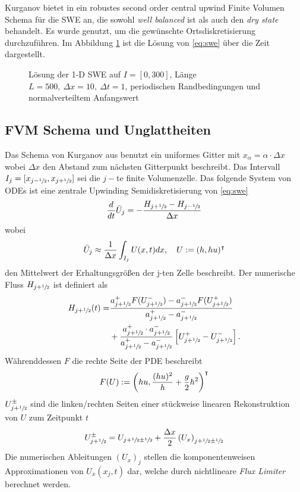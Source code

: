 Kurganov bietet in \cite{kurganov2007second} ein robustes second order central upwind Finite Volumen Schema für die SWE an, die sowohl \textit{well balanced} ist als auch den \textit{dry state} behandelt. Es wurde genutzt, um die gewünschte Ortsdiskretisierung durchzuführen. Im Abbildung \ref{fig:sweSolution} ist die Lösung von \eqref{eq:swe} über die Zeit dargestellt.

\begin{figure}
 \centering
 
 \caption{Lösung der 1-D SWE auf $I=[0,300]$, Länge $L=500,~\Delta x=10,~\Delta t=1$, periodischen Randbedingungen und normalverteiltem Anfangswert}
 \label{fig:sweSolution}
\end{figure}

\subsection{FVM Schema und Unglattheiten}
\label{sec:fvmFluxEigen}
Das Schema von Kurganov aus \cite{kurganov2007second} benutzt ein uniformes Gitter mit $x_\alpha=\alpha\cdot \Delta x$ wobei $\Delta x$ den Abstand zum nächsten Gitterpunkt beschreibt. Das Intervall $I_j = [x_{j-\sfrac{1}{2}},x_{j+\sfrac{1}{2}}]$ sei die $j-$te finite Volumenzelle.
Das folgende System von ODEs ist eine zentrale Upwinding Semidiskretisierung von \eqref{eq:swe} 
\[
 \frac{d}{dt} \bar U_j = - \frac{H_{j+\sfrac{1}{2}}-H_{j-\sfrac{1}{2}}}{\Delta x}
\]
wobei 
\[
 \bar U_j \approx \frac{1}{\Delta x}\int_{I_j} U(x,t) dx, \quad U:=(h,hu)^\intercal
\]
den Mittelwert der Erhaltungsgrößen der j-ten Zelle beschreibt. Der numerische Fluss $H_{j+\sfrac{1}{2}}$ ist definiert als
\[
\begin{aligned}
 H_{j+\sfrac{1}{2}}(t) =& \frac{a^+_{j+\sfrac{1}{2}}F(U^-_{j+\sfrac{1}{2}}) - a^-_{j+\sfrac{1}{2}}F(U^+_{j+\sfrac{1}{2}})}{a^+_{j+\sfrac{1}{2}} -a^-_{j+\sfrac{1}{2}}} \\
 & +\frac{a^+_{j+\sfrac{1}{2}} \cdot a^-_{j+\sfrac{1}{2}}}{a^+_{j+\sfrac{1}{2}} -a^-_{j+\sfrac{1}{2}}}\left[U^+_{j+\sfrac{1}{2}} - U^-_{j+\sfrac{1}{2}}\right].
\end{aligned}
 \]
Währenddessen $F$  die rechte Seite der PDE beschreibt
\[
 F(U) := \left( hu, \frac{(hu)^2}{h}  +\frac{g}{2} h^2 \right)^\intercal
\]
$U^\pm_{j+\sfrac{1}{2}}$ sind die linken/rechten Seiten einer stückweise linearen Rekonstruktion von $U$ zum Zeitpunkt $t$
\[
 U^\pm_{j+\sfrac{1}{2}} = U_{j+\sfrac{1}{2} \pm \sfrac{1}{2}} + \frac{\Delta x}{2} \left(U_x\right)_{j+\sfrac{1}{2}\pm\sfrac{1}{2}}
\]
Die numerischen Ableitungen $(U_x)_j$ stellen die komponentenweisen Approximationen von $U_x(x_j ,t)$ dar, welche durch nichtlineare \textit{Flux Limiter} berechnet werden. 
